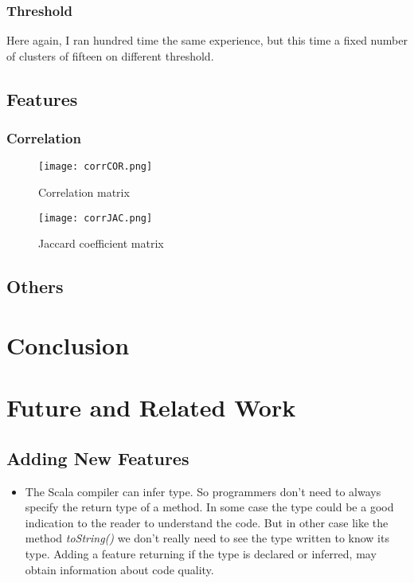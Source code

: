 \documentclass[12pt]{article}
\begin{document}
\subsubsection{Threshold}
\label{threshold}
Here again, I ran hundred time the same experience, but this time a fixed number of clusters of fifteen on different threshold.
\subsection {Features}

\subsubsection {Correlation}
\begin{figure}[tbc]
\centering
\texttt{[image: corrCOR.png]}
\caption{Correlation matrix}
\label{corrCor}
\end{figure}
\begin{figure}[tbc]
\centering
\texttt{[image: corrJAC.png]}
\caption{Jaccard coefficient matrix }
\label{corrJac}
\end{figure}

\subsection {Others} 

\section {Conclusion} 

\section {Future and Related Work}
\subsection{Adding New Features}
\begin{itemize}
\item The Scala compiler can infer type. So programmers don't need to always specify the return type of a method. In some case the type could be a good indication to the reader to understand the code. But in other case like the method \textit{toString()} we don't really need to see the type written to know its type. Adding a feature returning if the type is declared or inferred, may obtain information about code quality.
\end{itemize}
\end{document}
